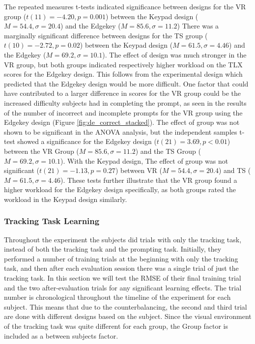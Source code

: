The repeated measures t-tests indicated significance between designs for the VR group ($t(11) = -4.20, p = 0.001$) between the Keypad design ($M = 54.4, \sigma = 20.4$) and the Edgekey ($M = 85.6, \sigma = 11.2$)
There was a marginally significant difference between designs for the TS group ($t(10) = -2.72, p = 0.02$) between the Keypad design ($M = 61.5, \sigma = 4.46$) and the Edgekey ($M = 69.2, \sigma = 10.1$).
The effect of design was much stronger in the VR group, but both groups indicated respectively higher workload on the TLX scores for the Edgekey design.
This follows from the experimental design which predicted that the Edgekey design would be more difficult.
One factor that could have contributed to a larger difference in scores for the VR group could be the increased difficulty subjects had in completing the prompt, as seen in the results of the number of incorrect and incomplete prompts for the VR group using the Edgekey design (Figure \ref{fig:de_correct_stacked}).
The effect of group was not shown to be significant in the ANOVA analysis, but the independent samples t-test showed a significance for the Edgekey design ($t(21) = 3.69, p < 0.01$) between the VR Group ($M = 85.6, \sigma = 11.2$) and the TS Group ($M = 69.2, \sigma = 10.1$).
With the Keypad design, The effect of group was not significant ($t(21) = -1.13, p=0.27$) between VR ($M = 54.4, \sigma = 20.4$) and TS ($M = 61.5, \sigma = 4.46$).
These tests further illustrate that the VR group found a higher workload for the Edgekey design specifically, as both groups rated the workload in the Keypad design similarly.

\subsubsection{Tracking Task Learning}

Throughout the experiment the subjects did trials with only the tracking task, instead of both the tracking task and the prompting task.
Initially, they performed a number of training trials at the beginning with only the tracking task, and then after each evaluation session there was a single trial of just the tracking task.
In this section we will test the RMSE of their final training trial and the two after-evaluation trials for any significant learning effects.
The trial number is chronological throughout the timeline of the experiment for each subject.
This means that due to the counterbalancing, the second and third trial are done with different designs based on the subject.
Since the visual environment of the tracking task was quite different for each group, the Group factor is included as a between subjects factor.

